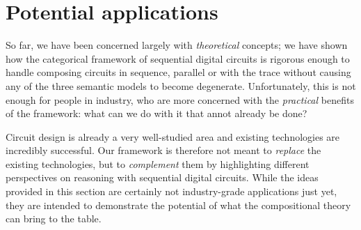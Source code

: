 \chapter{Potential applications}\label{chap:semantics-applications}

So far, we have been concerned largely with \emph{theoretical} concepts; we have
shown how the categorical framework of sequential digital circuits is rigorous
enough to handle composing circuits in sequence, parallel or with the trace
without causing any of the three semantic models to become degenerate.
Unfortunately, this is not enough for people in industry, who are more concerned
with the \emph{practical} benefits of the framework: what can we do with it that
annot already be done?

Circuit design is already a very well-studied area and existing technologies are
incredibly successful.
Our framework is therefore not meant to \emph{replace} the existing
technologies, but to \emph{complement} them by highlighting different
perspectives on reasoning with sequential digital circuits.
While the ideas provided in this section are certainly not industry-grade
applications just yet, they are intended to demonstrate the potential of what
the compositional theory can bring to the table.








